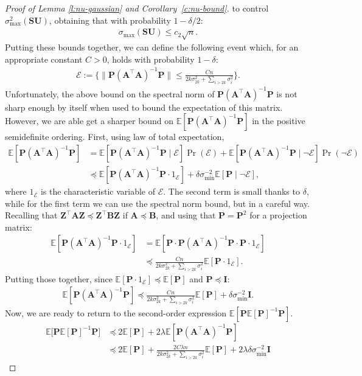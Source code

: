 \documentclass[11pt]{article}
\let\origtop\top
\renewcommand\top{{\scriptscriptstyle{\origtop}}}
\def\A{{\mathbf A}}
\def\B{{\mathbf B}}
\def\I{{\mathbf I}}
\def\S{{\mathbf S}}
\def\Z{{\mathbf Z}}
\def\Ec{{\mathcal E}}
\def\P{{\mathbf P}}
\def\E{{\mathds E}}
\def\U{{\mathbf U}}
\begin{document}
\begin{proof}[Proof of Lemma \ref{l:nu-gaussian} and Corollary~\ref{c:nu-bound}]
to control $\sigma_{\max}^2(\S\U)$, obtaining that with probability $1-\delta/2$:
\begin{align}
    \sigma_{\max}(\S\U) \leq c_2 \sqrt n.
\end{align}
Putting these bounds together, we can define the following event which, for an appropriate constant $C>0$, holds with probability $1-\delta$:
\begin{align*}
    \Ec := \Big\{\|\P(\A^\top\A)^{-1}\P\| \leq \frac{Cn}{2k\sigma_{2k}^2+\sum_{i>2k}\sigma_i^2}\Big\}.
\end{align*}
Unfortunately, the above bound on the spectral norm of $\P(\A^\top\A)^{-1}\P$ is not sharp enough by itself when used to bound the expectation of this matrix.
However, we are able get a sharper bound on $\E[\P(\A^\top\A)^{-1}\P]$ in the positive semidefinite ordering. First, using law of total expectation,  
\begin{align*}
    \E[\P(\A^\top\A)^{-1}\P] 
    &= \E[\P(\A^\top\A)^{-1}\P\mid\Ec] \Pr(\Ec) + \E[\P(\A^\top\A)^{-1}\P\mid\neg\Ec] \Pr(\neg\Ec)
    \\
    &\preceq \E[\P(\A^\top\A)^{-1}\P\cdot 1_{\Ec}] + \delta \sigma_{\min}^{-2}\E[\P\mid\neg\Ec],
\end{align*}
where $1_{\Ec}$ is the characteristic variable of $\Ec$. The second term is small thanks to $\delta$, while for the first term we can use the spectral norm bound, but in a careful way. Recalling that $\Z^\top \A \Z \preceq \Z^\top \B \Z$ if $\A \preceq \B$, and using that $\P=\P^2$ for a projection matrix:
\begin{align*}
    \E[\P(\A^\top\A)^{-1}\P \cdot 1_{\Ec}] 
    &= \E[\P\cdot\P(\A^\top\A)^{-1}\P\cdot\P \cdot 1_{\Ec}]
    \\
    &\preceq \frac{Cn}{2k\sigma_{2k}^2+\sum_{i>2k}\sigma_i^2}\E[\P \cdot 1_{\Ec}].
\end{align*}
Putting those together, since $\E[\P \cdot 1_{\Ec}] \preceq \E[\P]$ and $\P \preceq \I$: 
\begin{align*}
    \E[\P(\A^\top\A)^{-1}\P] \preceq \frac{Cn}{2k\sigma_{2k}^2+\sum_{i>2k}\sigma_i^2}\E[\P] + \delta\sigma_{\min}^{-2}\I.
\end{align*}
Now, we are ready to return to the second-order expression $\E[\P\E[\P]^{-1}\P]$. 
\begin{align*}
\E\big[\P\E[\P]^{-1}\P\big] &\preceq 2\E[\P] + 2\lambda\E[\P(\A^\top\A)^{-1}\P]
\\
&\preceq 2\E[\P] + \frac{2C\lambda n}{2k\sigma_{2k}^2+\sum_{i>2k}\sigma_i^2}\E[\P] + 2\lambda\delta\sigma_{\min}^{-2}\I

\end{align*}
\end{proof}
\end{document}
